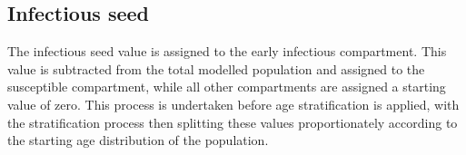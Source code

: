 \subsection{Infectious seed}
The infectious seed value is assigned to the early infectious compartment.
This value is subtracted from the total modelled population and assigned to the susceptible compartment, while all other compartments are assigned a starting value of zero.
This process is undertaken before age stratification is applied,
with the stratification process then splitting these values proportionately according to the starting age distribution of the population.
